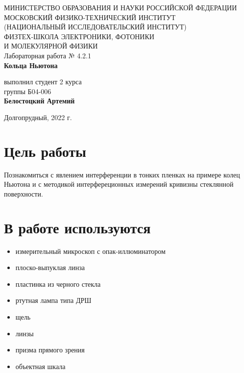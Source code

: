 \documentclass[a4paper,12pt]{article}
\begin{document}
 

\begin{titlepage}
	\begin{center}
		\large 	МИНИСТЕРСТВО ОБРАЗОВАНИЯ И НАУКИ РОССИЙСКОЙ ФЕДЕРАЦИИ\\
				МОСКОВСКИЙ ФИЗИКО-ТЕХНИЧЕСКИЙ ИНСТИТУТ \\
				(НАЦИОНАЛЬНЫЙ ИССЛЕДОВАТЕЛЬСКИЙ ИНСТИТУТ)\\ 
				ФИЗТЕХ-ШКОЛА ЭЛЕКТРОНИКИ, ФОТОНИКИ \\
				И МОЛЕКУЛЯРНОЙ ФИЗИКИ \\
		
		
		\vspace{4.0 cm}
		Лабораторная работа № 4.2.1 \\ 
		\LARGE \textbf{Кольца Ньютона}
	\end{center}
	\vspace{3 cm} \large
	
	\begin{flushright}
		выполнил студент 2 курса \\
		{группы Б04-006}\\
		\textbf{Белостоцкий Артемий}\\
	\end{flushright}
	
	\vfill

	\begin{center}
	Долгопрудный, 2022 г.
	\end{center}
\end{titlepage}                                                                      

\section*{Цель работы}

Познакомиться с явлением интерференции в тонких пленках на примере колец Ньютона и с методикой интерфереционных измерений кривизны стеклянной поверхности.


\section*{В работе используются}
\begin{itemize}
\item измерительный микроскоп с опак-иллюминатором
\item плоско-выпуклая линза
\item пластинка из черного стекла 
\item ртутная лампа типа ДРШ
\item щель
\item линзы
\item призма прямого зрения
\item объектная шкала


\end{itemize}
\end{document}
